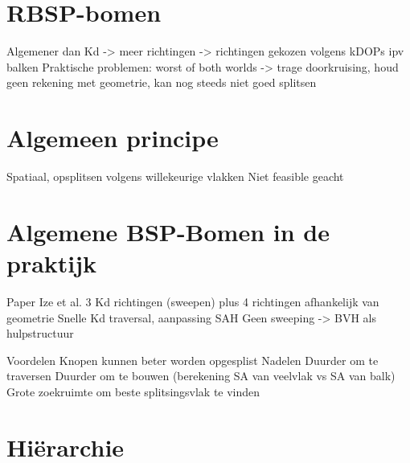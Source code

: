 \section{RBSP-bomen}
    Algemener dan Kd -> meer richtingen -> richtingen gekozen volgens
    kDOPs ipv balken
    Praktische problemen: worst of both worlds -> trage doorkruising, 
    houd geen rekening met geometrie, kan nog steeds niet goed splitsen
\section{Algemeen principe}
    Spatiaal, opsplitsen volgens willekeurige vlakken
    Niet feasible geacht
\section{Algemene BSP-Bomen in de praktijk}
    Paper Ize et al.
        3 Kd richtingen (sweepen) plus 4 richtingen afhankelijk van geometrie 
        Snelle Kd traversal, aanpassing SAH
        Geen sweeping -> BVH als hulpstructuur
    
    Voordelen
        Knopen kunnen beter worden opgesplist
    Nadelen
        Duurder om te traversen
        Duurder om te bouwen (berekening SA van veelvlak vs SA van balk)
        Grote zoekruimte om beste splitsingsvlak te vinden
\section{Hiërarchie}


